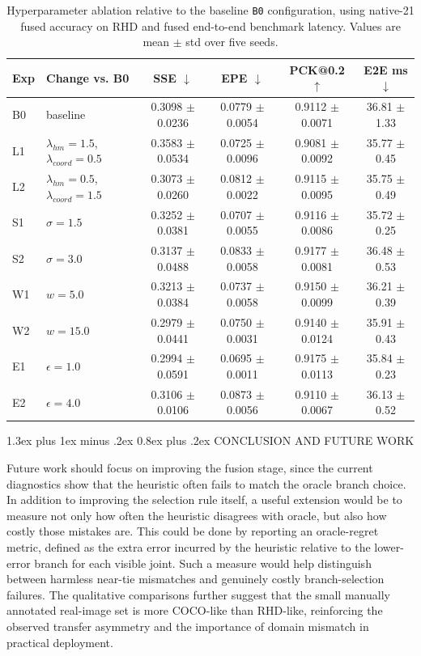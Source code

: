 \documentclass[10pt,letterpaper]{article}
\makeatletter
\renewcommand\section{\@startsection{section}{1}{\z@}%
  {1.3ex plus 1ex minus .2ex}%
  {0.8ex plus .2ex}%
  {\centering\normalfont\small\scshape}}
\makeatother
\begin{document}
\begin{table}[H]
\centering
\footnotesize
\caption{Hyperparameter ablation relative to the baseline \texttt{B0} configuration, using native-21 fused accuracy on RHD and fused end-to-end benchmark latency. Values are mean $\pm$ std over five seeds.}
\label{tab:hyper_ablation}
\begin{tabular}{llcccc}
\toprule
Exp & Change vs. B0 & SSE $\downarrow$ & EPE $\downarrow$ & PCK@0.2 $\uparrow$ & E2E ms $\downarrow$ \\
\midrule
B0 & baseline & 0.3098 $\pm$ 0.0236 & 0.0779 $\pm$ 0.0054 & 0.9112 $\pm$ 0.0071 & 36.81 $\pm$ 1.33 \\
L1 & $\lambda_{hm}=1.5$, $\lambda_{coord}=0.5$ & 0.3583 $\pm$ 0.0534 & 0.0725 $\pm$ 0.0096 & 0.9081 $\pm$ 0.0092 & 35.77 $\pm$ 0.45 \\
L2 & $\lambda_{hm}=0.5$, $\lambda_{coord}=1.5$ & 0.3073 $\pm$ 0.0260 & 0.0812 $\pm$ 0.0022 & 0.9115 $\pm$ 0.0095 & 35.75 $\pm$ 0.49 \\
S1 & $\sigma=1.5$ & 0.3252 $\pm$ 0.0381 & 0.0707 $\pm$ 0.0055 & 0.9116 $\pm$ 0.0086 & 35.72 $\pm$ 0.25 \\
S2 & $\sigma=3.0$ & 0.3137 $\pm$ 0.0488 & 0.0833 $\pm$ 0.0058 & 0.9177 $\pm$ 0.0081 & 36.48 $\pm$ 0.53 \\
W1 & $w=5.0$ & 0.3213 $\pm$ 0.0384 & 0.0737 $\pm$ 0.0058 & 0.9150 $\pm$ 0.0099 & 36.21 $\pm$ 0.39 \\
W2 & $w=15.0$ & 0.2979 $\pm$ 0.0441 & 0.0750 $\pm$ 0.0031 & 0.9140 $\pm$ 0.0124 & 35.91 $\pm$ 0.43 \\
E1 & $\epsilon=1.0$ & 0.2994 $\pm$ 0.0591 & 0.0695 $\pm$ 0.0011 & 0.9175 $\pm$ 0.0113 & 35.84 $\pm$ 0.23 \\
E2 & $\epsilon=4.0$ & 0.3106 $\pm$ 0.0106 & 0.0873 $\pm$ 0.0056 & 0.9110 $\pm$ 0.0067 & 36.13 $\pm$ 0.52 \\
\bottomrule
\end{tabular}
\end{table}

\section{CONCLUSION AND FUTURE WORK}

Future work should focus on improving the fusion stage, since the current diagnostics show that the heuristic often fails to match the oracle branch choice. In addition to improving the selection rule itself, a useful extension would be to measure not only how often the heuristic disagrees with oracle, but also how costly those mistakes are. This could be done by reporting an oracle-regret metric, defined as the extra error incurred by the heuristic relative to the lower-error branch for each visible joint. Such a measure would help distinguish between harmless near-tie mismatches and genuinely costly branch-selection failures. The qualitative comparisons further suggest that the small manually annotated real-image set is more COCO-like than RHD-like, reinforcing the observed transfer asymmetry and the importance of domain mismatch in practical deployment.
\end{document}
